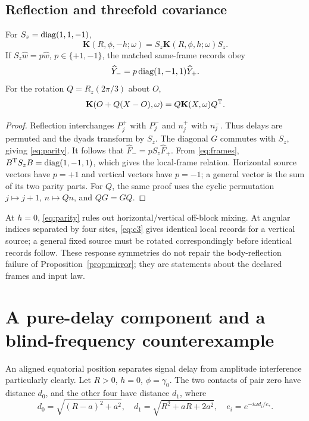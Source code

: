 \subsection{Reflection and threefold covariance}
\begin{proposition}\label{prop:parity}
For $S_z=\operatorname{diag}(1,1,-1)$,
\begin{equation}\label{eq:parity}
\mathbf K(R,\phi,-h;\omega)=S_z\mathbf K(R,\phi,h;\omega)S_z.
\end{equation}
If $S_z\widehat w=p\widehat w$, $p\in\{+1,-1\}$, the matched same-frame records obey
\[
\widehat Y_- =p\operatorname{diag}(1,-1,1)\widehat Y_+.
\]
For the rotation $Q=R_z(2\pi/3)$ about $O$,
\begin{equation}\label{eq:c3}
\mathbf K(O+Q(X-O),\omega)=Q\mathbf K(X,\omega)Q^{\mathrm T}.
\end{equation}
\end{proposition}
\begin{proof}
Reflection interchanges $P_j^+$ with $P_j^-$ and $n_j^+$ with $n_j^-$. Thus delays are permuted and the dyads transform by $S_z$. The diagonal $G$ commutes with $S_z$, giving \eqref{eq:parity}. It follows that $\widehat F_-=pS_z\widehat F_+$. From \eqref{eq:frames}, $B^{\mathrm T} S_z B=\operatorname{diag}(1,-1,1)$, which gives the local-frame relation. Horizontal source vectors have $p=+1$ and vertical vectors have $p=-1$; a general vector is the sum of its two parity parts. For $Q$, the same proof uses the cyclic permutation $j\mapsto j+1$, $n\mapsto Qn$, and $QG=GQ$.
\end{proof}
At $h=0$, \eqref{eq:parity} rules out horizontal/vertical off-block mixing. At angular indices separated by four sites, \eqref{eq:c3} gives identical local records for a vertical source; a general fixed source must be rotated correspondingly before identical records follow. These response symmetries do not repair the body-reflection failure of Proposition~\ref{prop:mirror}; they are statements about the declared frames and input law.

\section{A pure-delay component and a blind-frequency counterexample}\label{sec:aligned}
An aligned equatorial position separates signal delay from amplitude interference particularly clearly. Let $R>0$, $h=0$, $\phi=\gamma_0$. The two contacts of pair zero have distance $d_0$, and the other four have distance $d_1$, where
\begin{equation}\label{eq:twodist}
d_0=\sqrt{(R-a)^2+a^2},\quad
d_1=\sqrt{R^2+aR+2a^2},\quad e_i=e^{-i\omega d_i/c_*}.
\end{equation}

